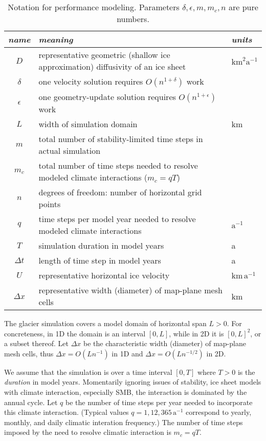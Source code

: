 \documentclass[twocolumn,letterpaper]{igs}
\newcommand\eps{\epsilon}
\begin{document}
\begin{table*}[ht]
\begin{center}
\begin{tabular}{cll}
\emph{name} & \emph{meaning} & \emph{units} \\ \hline
$D$         & representative geometric (shallow ice approximation) diffusivity of an ice sheet & $\text{km}^2 \text{a}^{-1}$ \\
$\delta$    & one velocity solution requires $O(n^{1+\delta})$ work\\
$\eps$      & one geometry-update solution requires $O(n^{1+\eps})$ work \\
$L$         & width of simulation domain & km \\
$m$         & total number of stability-limited time steps in actual simulation \\
$m_c$       & total number of time steps needed to resolve modeled climate interactions ($m_c=qT$) \\
$n$         & degrees of freedom: number of horizontal grid points \\
$q$         & time steps per model year needed to resolve modeled climate interactions & $\text{a}^{-1}$ \\
$T$         & simulation duration in model years & a \\
$\Delta t$  & length of time step in model years & a \\
$U$         & representative horizontal ice velocity & $\text{km}\,\text{a}^{-1}$ \\
$\Delta x$  & representative width (diameter) of map-plane mesh cells & km
\end{tabular}
\end{center}

\medskip
\caption{Notation for performance modeling.  Parameters $\delta,\eps,m, m_c,n$ are pure numbers.}
\label{tab:notation}
\end{table*}

The glacier simulation covers a model domain of horizontal span $L>0$.  For concreteness, in 1D the domain is an interval $[0,L]$, while in 2D it is $[0,L]^2$, or a subset thereof.  Let $\Delta x$ be the characteristic width (diameter) of map-plane mesh cells, thus $\Delta x = O(L n^{-1})$ in 1D and $\Delta x = O(L n^{-1/2})$ in 2D.

We assume that the simulation is over a time interval $[0,T]$ where $T>0$ is the \emph{duration} in model years.  Momentarily ignoring issues of stability, ice sheet models with climate interaction, especially SMB, the interaction is dominated by the annual cycle.  Let $q$ be the number of time steps per year needed to incorporate this climate interaction.  (Typical values $q=1,12,365 \,\text{a}^{-1}$ correspond to yearly, monthly, and daily climatic interation frequency.)  The number of time steps imposed by the need to resolve climatic interaction is $m_c=qT$.
\end{document}

